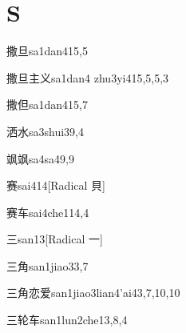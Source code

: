 
\section*{S}

\begin{verbete}{撒旦}{sa1dan4}{15,5}
\end{verbete}

\begin{verbete}{撒旦主义}{sa1dan4 zhu3yi4}{15,5,5,3}
\end{verbete}

\begin{verbete}{撒但}{sa1dan4}{15,7}
\end{verbete}

\begin{verbete}{洒水}{sa3shui3}{9,4}
\end{verbete}

\begin{verbete}{飒飒}{sa4sa4}{9,9}
\end{verbete}

\begin{verbete}{赛}{sai4}{14}[Radical 貝]
\end{verbete}

\begin{verbete}{赛车}{sai4che1}{14,4}
\end{verbete}

\begin{verbete}{三}{san1}{3}[Radical 一]
\end{verbete}

\begin{verbete}{三角}{san1jiao3}{3,7}
\end{verbete}

\begin{verbete}{三角恋爱}{san1jiao3lian4'ai4}{3,7,10,10}
\end{verbete}

\begin{verbete}{三轮车}{san1lun2che1}{3,8,4}
\end{verbete}

